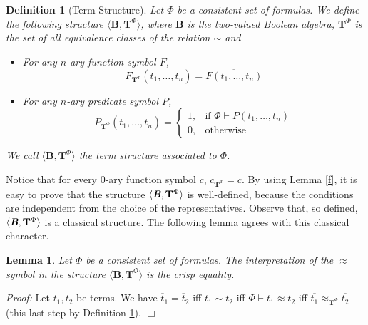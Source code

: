 \documentclass{IOS-Book-Article}
\newtheorem{lemma}{Lemma}
\newtheorem{defi}{Definition}
\newenvironment{proof}{ \noindent \textit{Proof:} }
{\hfill$\Box$\endtrivlist}
\begin{document}
\smallskip


\begin{defi}  [Term Structure] \label{structure}
Let $\Phi$ be a consistent set of formulas. We define the following structure $\langle\textbf{B},\mathrm{\mathbf{T}}^{\Phi}\rangle$, where $\textbf{B}$ is the two-valued Boolean algebra, $\mathrm{\mathbf{T}}^{\Phi}$ is the set of all equivalence classes of the relation $\sim$ and 
\begin{itemize}

\item For any $n$-ary function symbol $F$, 
$$F_{\mathrm{\mathbf{T}}^{\Phi}}(\overline{t}_1,\ldots,\overline{t}_n)=\overline{F(t_1,\ldots,t_n)}$$

\item For any $n$-ary predicate symbol $P$, 
 $$ P_{\mathrm{\mathbf{T}}^{\Phi}}(\overline{t}_1,\ldots,\overline{t}_n)=\begin{cases} 1, & \mbox{if } \Phi\vdash P(t_1,\ldots, t_n) \\ 0, & \mbox{otherwise } \end{cases} $$ 

\end{itemize}
We call $\langle\textbf{B},\mathrm{\mathbf{T}}^{\Phi}\rangle$ the \emph{term structure associated to $\Phi$}. 
\end{defi}

Notice that for every $0$-ary function symbol $c$, $c_{\mathrm{\mathbf{T}}^{\Phi}}=\overline{c}$. By using Lemma \ref{f}, it is easy to prove that the structure $\langle\emph{\textbf{B}},\mathrm{\mathbf{T}}^{\Phi}\rangle$ is well-defined, because the conditions are independent from the choice of the representatives. Observe that, so defined, $\langle\emph{\textbf{B}},\mathrm{\mathbf{T}}^{\Phi}\rangle$ is a classical structure. The following lemma agrees with this classical character. 
\begin{lemma} \label{crisp}
Let $\Phi$ be a consistent set of formulas. The interpretation of the $\approx$ symbol in the structure $\langle\textbf{B},\mathrm{\mathbf{T}}^{\Phi}\rangle$ is the crisp equality. 
\end{lemma}
\begin{proof}
Let $t_1,t_2$ be terms. We have $\overline{t}_1=\overline{t}_2$ iff $t_1\sim t_2$ iff $\Phi\vdash t_1\approx t_2$ iff 
$\overline{t_1}\approx_{\mathrm{\mathbf{T}}^{\Phi}} \overline{t_2}$ (this last step by Definition \ref{structure}). \end{proof}
\end{document}
